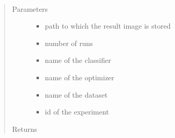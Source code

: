 \documentclass[letterpaper,10pt,english]{sphinxmanual}
\begin{document}
\begin{fulllineitems}
\label{\detokenize{index:plots.plot_hoo}}~\begin{quote}\begin{description}
\item[{Parameters}] \leavevmode\begin{itemize}
\item {} 
 \textendash{} path to which the result image is stored

\item {} 
 \textendash{} number of runs

\item {} 
 \textendash{} name of the classifier

\item {} 
 \textendash{} name of the optimizer

\item {} 
 \textendash{} name of the dataset

\item {} 
 \textendash{} id of the experiment

\end{itemize}

\item[{Returns}] \leavevmode


\end{description}\end{quote}

\end{fulllineitems}

\end{document}
